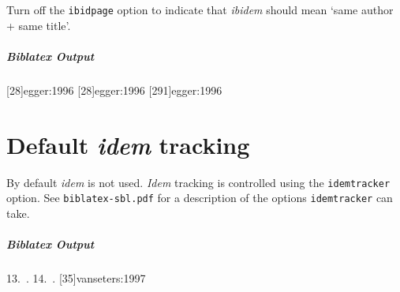 \documentclass[a4paper]{article}
\newenvironment{biboutput}{%
  \subparagraph{Biblatex Output}
}{\color{black}}
\begin{document}
Turn off the \texttt{ibidpage} option to indicate that \emph{ibidem} should
mean ‘same author + same title’.

\makeatletter
\blx@opt@loccittracker@false
\makeatother

\begin{biboutput}
  [28]{egger:1996}
  [28]{egger:1996}
  [291]{egger:1996}
\end{biboutput}

\section*{Default \emph{idem} tracking}

By default \emph{idem} is not used. \emph{Idem} tracking is controlled using
the \texttt{idemtracker} option. See \texttt{biblatex-sbl.pdf} for a
description of the options \texttt{idemtracker} can take.

\begin{biboutput}
  \color{biblatex-colour}
  \hspace*{\bibindent}13.~\cites[35]{vanseters:1997}{vanseters:1995}.
  \color{black}
  \makeatletter\blx@idemreset\makeatother
  \color{biblatex-colour}
  \hspace*{\bibindent}14.~\cites[35]{vanseters:1997}[222]{vanseters:1995}.
  \color{black}
  \makeatletter\blx@idemreset\makeatother
  [35]{vanseters:1997}
\end{biboutput}

\printbibliography

\printindex
\end{document}
